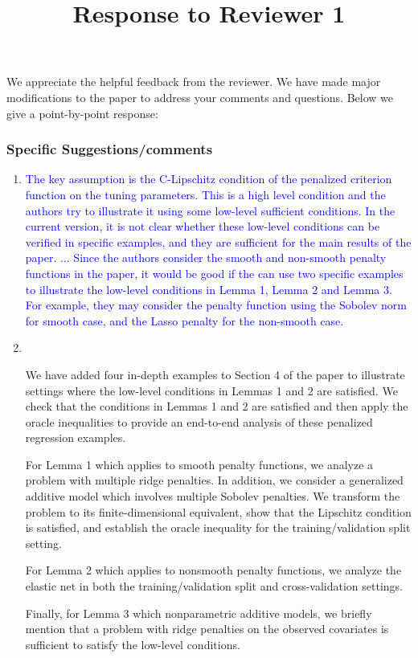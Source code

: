 \documentclass[]{article}
\title{Response to Reviewer 1}
\newcommand{\point}[1]{\item \textcolor{blue}{#1}}
\newcommand{\reply}{\item[]\ }
\begin{document}
	
	\maketitle
	
	We appreciate the helpful feedback from the reviewer.
	We have made major modifications to the paper to address your comments and questions.
	Below we give a point-by-point response:
	
	\subsubsection*{Specific Suggestions/comments}
	
	\begin{enumerate}
		\point{
			The key assumption is the C-Lipschitz condition of the penalized criterion function on the tuning parameters.  This is a high level condition and the authors try to illustrate it using some low-level sufficient conditions.
			In the current version, it is not clear whether these low-level conditions can be verified in specific examples, and they are sufficient for the main results of the paper.
			...
			Since the authors consider the smooth and non-smooth penalty functions in the paper, it would be good if the can use two specific examples to illustrate the low-level conditions in Lemma 1, Lemma 2 and Lemma 3. For example, they may consider the penalty function using the Sobolev norm for smooth case, and the Lasso penalty for the non-smooth case.
		}
		\reply{
		We have added four in-depth examples to Section 4 of the paper to illustrate settings where the low-level conditions in Lemmas 1 and 2 are satisfied.
		We check that the conditions in Lemmas 1 and 2 are satisfied and then apply the oracle inequalities to provide an end-to-end analysis of these penalized regression examples.

		For Lemma 1 which applies to smooth penalty functions, we analyze a problem with multiple ridge penalties.
		In addition, we consider a generalized additive model which involves multiple Sobolev penalties.
		We transform the problem to its finite-dimensional equivalent, show that the Lipschitz condition is satisfied, and establish the oracle inequality for the training/validation split setting.

		For Lemma 2 which applies to nonsmooth penalty functions, we analyze the elastic net in both the training/validation split and cross-validation settings.

		Finally, for Lemma 3 which nonparametric additive models, we briefly mention that a problem with ridge penalties on the observed covariates is sufficient to satisfy the low-level conditions.

}
\end{enumerate}
\end{document}
